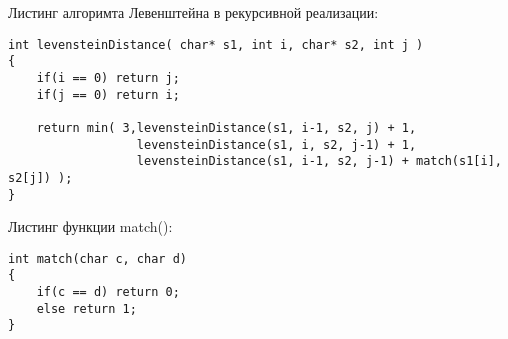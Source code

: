 Листинг алгоримта Левенштейна в рекурсивной реализации:
\begin{lstlisting}[style=CStyle]
int levensteinDistance( char* s1, int i, char* s2, int j )
{
    if(i == 0) return j;
    if(j == 0) return i;

    return min( 3,levensteinDistance(s1, i-1, s2, j) + 1,
                  levensteinDistance(s1, i, s2, j-1) + 1,
                  levensteinDistance(s1, i-1, s2, j-1) + match(s1[i], s2[j]) );
}
\end{lstlisting}

Листинг функции match():
\begin{lstlisting}[style=CStyle]
int match(char c, char d)
{
    if(c == d) return 0;
    else return 1;
}
\end{lstlisting}
